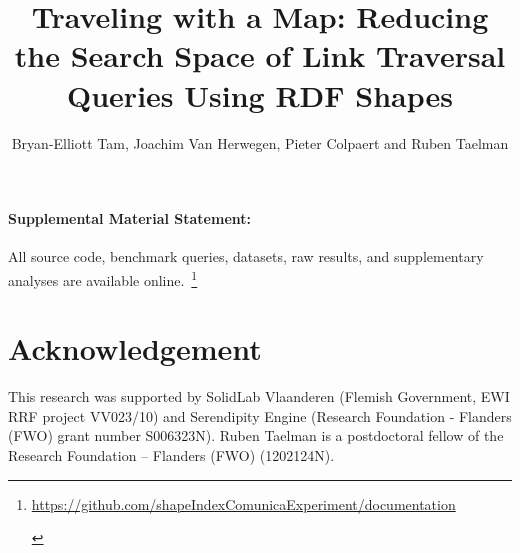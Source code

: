 \documentclass[Afour,sageh,times]{sagej}
\newif\ifanonymous
\begin{document}
\linenumbers
{}

\title{Traveling with a Map: Reducing the Search Space of Link Traversal Queries Using RDF Shapes}
\ifanonymous
      \author{Anonymous}
    \else
      \author{Bryan-Elliott Tam, Joachim Van Herwegen, Pieter Colpaert and Ruben Taelman}



   \fi 





\maketitle










\paragraph*{Supplemental Material Statement:}\label{sec:supplementalMaterial} All source code, benchmark queries, datasets, raw results, and supplementary analyses are available online.~\footnote{
    \ifanonymous
       \url{https://anonymous.4open.science/r/documentation-1A65}
    \else
       \url{https://github.com/shapeIndexComunicaExperiment/documentation}
    \fi 
    \label{sf:supplementalMaterial}}

\section{Acknowledgement}

This research was supported by SolidLab Vlaanderen (Flemish Government, EWI RRF project VV023/10) and Serendipity Engine (Research Foundation - Flanders (FWO) grant number S006323N).
Ruben Taelman is a postdoctoral fellow of the Research Foundation – Flanders (FWO) (1202124N).

\printbibliography
{}


\end{document}
